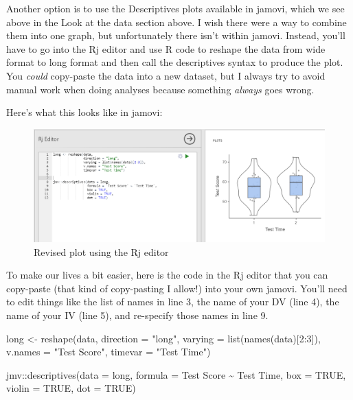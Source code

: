 \documentclass[
]{book}
\newenvironment{Shaded}{\begin{snugshade}}{\end{snugshade}}
\newcommand{\AttributeTok}[1]{\textcolor[rgb]{0.77,0.63,0.00}{#1}}
\newcommand{\ConstantTok}[1]{\textcolor[rgb]{0.00,0.00,0.00}{#1}}
\newcommand{\DecValTok}[1]{\textcolor[rgb]{0.00,0.00,0.81}{#1}}
\newcommand{\FunctionTok}[1]{\textcolor[rgb]{0.00,0.00,0.00}{#1}}
\newcommand{\NormalTok}[1]{#1}
\newcommand{\OtherTok}[1]{\textcolor[rgb]{0.56,0.35,0.01}{#1}}
\newcommand{\SpecialCharTok}[1]{\textcolor[rgb]{0.00,0.00,0.00}{#1}}
\newcommand{\StringTok}[1]{\textcolor[rgb]{0.31,0.60,0.02}{#1}}
\begin{document}
Another option is to use the Descriptives plots available in jamovi, which we see above in the Look at the data section above. I wish there were a way to combine them into one graph, but unfortunately there isn't within jamovi. Instead, you'll have to go into the Rj editor and use R code to reshape the data from wide format to long format and then call the descriptives syntax to produce the plot. You \emph{could} copy-paste the data into a new dataset, but I always try to avoid manual work when doing analyses because something \emph{always} goes wrong.

Here's what this looks like in jamovi:

\begin{figure}

{\centering \includegraphics[width=1\linewidth]{images/03_dependent_t-test/dependent_results_plot2} 

}

\caption{Revised plot using the Rj editor}\label{fig:unnamed-chunk-9}
\end{figure}

To make our lives a bit easier, here is the code in the Rj editor that you can copy-paste (that kind of copy-pasting I allow!) into your own jamovi. You'll need to edit things like the list of names in line 3, the name of your DV (line 4), the name of your IV (line 5), and re-specify those names in line 9.

\begin{Shaded}
\begin{Highlighting}[]
\NormalTok{long }\OtherTok{\textless{}{-}} \FunctionTok{reshape}\NormalTok{(data, }
                \AttributeTok{direction =} \StringTok{"long"}\NormalTok{, }
                \AttributeTok{varying =} \FunctionTok{list}\NormalTok{(}\FunctionTok{names}\NormalTok{(data)[}\DecValTok{2}\SpecialCharTok{:}\DecValTok{3}\NormalTok{]),}
                \AttributeTok{v.names =} \StringTok{"Test Score"}\NormalTok{,}
                \AttributeTok{timevar =} \StringTok{"Test Time"}\NormalTok{)}


\NormalTok{jmv}\SpecialCharTok{::}\FunctionTok{descriptives}\NormalTok{(}\AttributeTok{data =}\NormalTok{ long,}
                  \AttributeTok{formula =} \StringTok{\textasciigrave{}}\AttributeTok{Test Score}\StringTok{\textasciigrave{}} \SpecialCharTok{\textasciitilde{}} \StringTok{\textasciigrave{}}\AttributeTok{Test Time}\StringTok{\textasciigrave{}}\NormalTok{,}
                  \AttributeTok{box =} \ConstantTok{TRUE}\NormalTok{,}
                  \AttributeTok{violin =} \ConstantTok{TRUE}\NormalTok{,}
                  \AttributeTok{dot =} \ConstantTok{TRUE}\NormalTok{)}
\end{Highlighting}
\end{Shaded}
\end{document}
